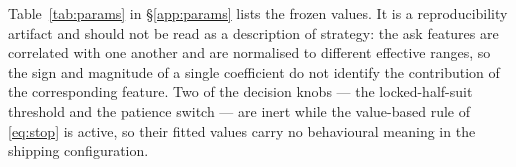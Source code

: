 Table~\ref{tab:params} in \S\ref{app:params} lists the frozen values. It is a
reproducibility artifact and should not be read as a description of strategy: the
ask features are correlated with one another and are normalised to different
effective ranges, so the sign and magnitude of a single coefficient do not
identify the contribution of the corresponding feature. Two of the decision
knobs --- the locked-half-suit threshold and the patience switch --- are inert
while the value-based rule of \eqref{eq:stop} is active, so their fitted values
carry no behavioural meaning in the shipping configuration.
